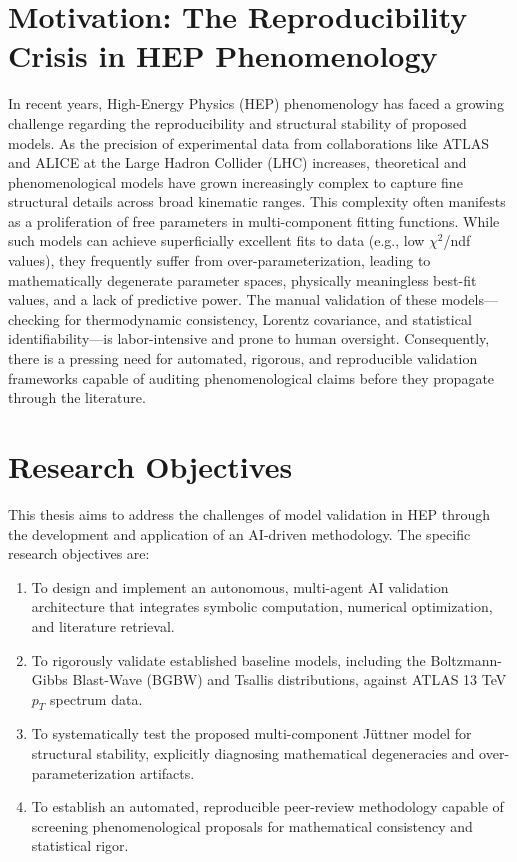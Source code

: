\section{Motivation: The Reproducibility Crisis in HEP Phenomenology}
In recent years, High-Energy Physics (HEP) phenomenology has faced a growing challenge regarding the reproducibility and structural stability of proposed models. As the precision of experimental data from collaborations like ATLAS and ALICE at the Large Hadron Collider (LHC) increases, theoretical and phenomenological models have grown increasingly complex to capture fine structural details across broad kinematic ranges. This complexity often manifests as a proliferation of free parameters in multi-component fitting functions. While such models can achieve superficially excellent fits to data (e.g., low $\chi^2$/ndf values), they frequently suffer from over-parameterization, leading to mathematically degenerate parameter spaces, physically meaningless best-fit values, and a lack of predictive power. The manual validation of these models—checking for thermodynamic consistency, Lorentz covariance, and statistical identifiability—is labor-intensive and prone to human oversight. Consequently, there is a pressing need for automated, rigorous, and reproducible validation frameworks capable of auditing phenomenological claims before they propagate through the literature.

\section{Research Objectives}
This thesis aims to address the challenges of model validation in HEP through the development and application of an AI-driven methodology. The specific research objectives are:
\begin{enumerate}
    \item To design and implement an autonomous, multi-agent AI validation architecture that integrates symbolic computation, numerical optimization, and literature retrieval.
    \item To rigorously validate established baseline models, including the Boltzmann-Gibbs Blast-Wave (BGBW) and Tsallis distributions, against ATLAS 13 TeV $p_T$ spectrum data.
    \item To systematically test the proposed multi-component J\"uttner model for structural stability, explicitly diagnosing mathematical degeneracies and over-parameterization artifacts.
    \item To establish an automated, reproducible peer-review methodology capable of screening phenomenological proposals for mathematical consistency and statistical rigor.
\end{enumerate}

